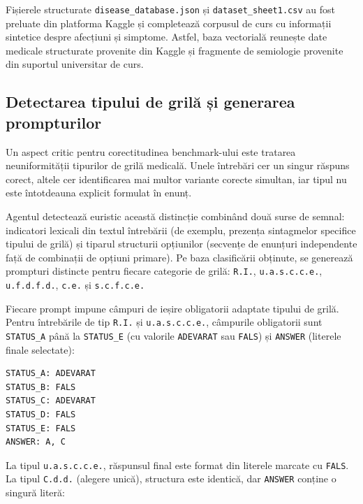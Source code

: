 \documentclass[12pt, a4paper, oneside, romanian]{teza-upb}
\begin{document}
Fișierele structurate \texttt{disease\_database.json} și \texttt{dataset\_sheet1.csv} au fost preluate din platforma Kaggle și completează corpusul de curs cu informații sintetice despre afecțiuni și simptome. Astfel, baza vectorială reunește date medicale structurate provenite din Kaggle și fragmente de semiologie provenite din suportul universitar de curs.

\subsection{Detectarea tipului de grilă și generarea prompturilor}

Un aspect critic pentru corectitudinea benchmark-ului este tratarea neuniformității tipurilor de grilă medicală. Unele întrebări cer un singur răspuns corect, altele cer identificarea mai multor variante corecte simultan, iar tipul nu este întotdeauna explicit formulat în enunț.

Agentul detectează euristic această distincție combinând două surse de semnal: indicatori lexicali din textul întrebării (de exemplu, prezența sintagmelor specifice tipului de grilă) și tiparul structurii opțiunilor (secvențe de enunțuri independente față de combinații de opțiuni primare). Pe baza clasificării obținute, se generează prompturi distincte pentru fiecare categorie de grilă: \texttt{R.I.}, \texttt{u.a.s.c.c.e.}, \texttt{u.f.d.f.d.}, \texttt{c.e.} și \texttt{s.c.f.c.e.}



Fiecare prompt impune câmpuri de ieșire obligatorii adaptate tipului de grilă. Pentru întrebările de tip \texttt{R.I.} și \texttt{u.a.s.c.c.e.}, câmpurile obligatorii sunt \texttt{STATUS\_A} până la \texttt{STATUS\_E} (cu valorile \texttt{ADEVARAT} sau \texttt{FALS}) și \texttt{ANSWER} (literele finale selectate):

\begin{center}
\begin{minipage}{0.34\textwidth}
\begin{lstlisting}[numbers=none]
STATUS_A: ADEVARAT
STATUS_B: FALS
STATUS_C: ADEVARAT
STATUS_D: FALS
STATUS_E: FALS
ANSWER: A, C
\end{lstlisting}
\end{minipage}
\end{center}

La tipul \texttt{u.a.s.c.c.e.}, răspunsul final este format din literele marcate cu \texttt{FALS}. La tipul \texttt{C.d.d.} (alegere unică), structura este identică, dar \texttt{ANSWER} conține o singură literă:
\end{document}
